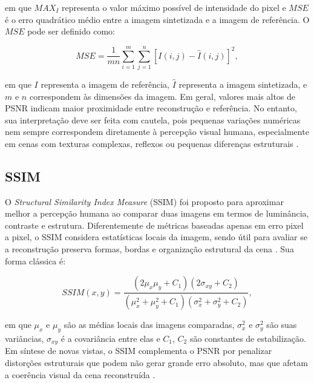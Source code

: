 em que $MAX_I$ representa o valor máximo possível de intensidade do pixel e $MSE$ é o erro quadrático médio entre a imagem sintetizada e a imagem de referência. O $MSE$ pode ser definido como:

\begin{equation}
MSE = \frac{1}{mn}\sum_{i=1}^{m}\sum_{j=1}^{n}
\left[I(i,j) - \hat{I}(i,j)\right]^2,
\label{eq:mse}
\end{equation}

em que $I$ representa a imagem de referência, $\hat{I}$ representa a imagem sintetizada, e $m$ e $n$ correspondem às dimensões da imagem. Em geral, valores mais altos de PSNR indicam maior proximidade entre reconstrução e referência. No entanto, sua interpretação deve ser feita com cautela, pois pequenas variações numéricas nem sempre correspondem diretamente à percepção visual humana, especialmente em cenas com texturas complexas, reflexos ou pequenas diferenças estruturais \cite{mildenhall2020,kerbl2023,zhang2018}.

\subsection{SSIM}

O \textit{Structural Similarity Index Measure} (SSIM) foi proposto para aproximar melhor a percepção humana ao comparar duas imagens em termos de luminância, contraste e estrutura. Diferentemente de métricas baseadas apenas em erro pixel a pixel, o SSIM considera estatísticas locais da imagem, sendo útil para avaliar se a reconstrução preserva formas, bordas e organização estrutural da cena \cite{wang2004,mildenhall2020,kerbl2023}. Sua forma clássica é:

\begin{equation}
SSIM(x,y)=
\frac{(2\mu_x\mu_y + C_1)(2\sigma_{xy}+C_2)}
{(\mu_x^2+\mu_y^2+C_1)(\sigma_x^2+\sigma_y^2+C_2)},
\label{eq:ssim}
\end{equation}

em que $\mu_x$ e $\mu_y$ são as médias locais das imagens comparadas, $\sigma_x^2$ e $\sigma_y^2$ são suas variâncias, $\sigma_{xy}$ é a covariância entre elas e $C_1$, $C_2$ são constantes de estabilização. Em síntese de novas vistas, o SSIM complementa o PSNR por penalizar distorções estruturais que podem não gerar grande erro absoluto, mas que afetam a coerência visual da cena reconstruída \cite{wang2004,mildenhall2020,kerbl2023}.

